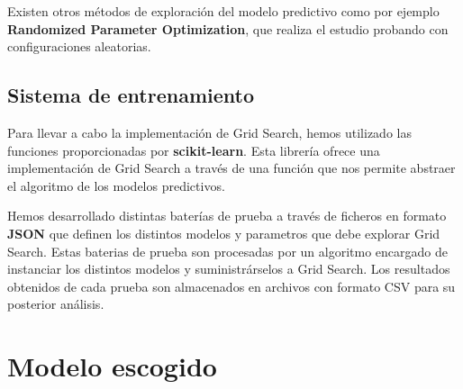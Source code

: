 	Existen otros métodos de exploración del modelo predictivo como por ejemplo \textbf{Randomized Parameter Optimization}, que realiza el estudio probando con configuraciones aleatorias.

	\subsection{Sistema de entrenamiento}
	Para llevar a cabo la implementación de Grid Search, hemos utilizado las funciones proporcionadas por \textbf{scikit-learn}.
	Esta librería ofrece una implementación de Grid Search a través de una función que nos permite abstraer el algoritmo de los modelos predictivos.

	Hemos desarrollado distintas baterías de prueba a través de ficheros en formato \textbf{JSON} que definen los distintos modelos y parametros que debe explorar Grid Search.
	Estas baterias de prueba son procesadas por un algoritmo encargado de instanciar los distintos modelos y suministrárselos a Grid Search.
	Los resultados obtenidos de cada prueba son almacenados en archivos con formato CSV para su posterior análisis.

\section{Modelo escogido}
\label{makereference4.5}
